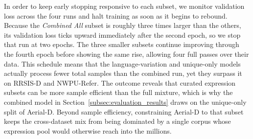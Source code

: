 In order to keep early stopping responsive to each subset, we monitor validation loss across the four runs and halt training as soon as it begins to rebound. Because the \emph{Combined All} subset is roughly three times larger than the others, its validation loss ticks upward immediately after the second epoch, so we stop that run at two epochs. The three smaller subsets continue improving through the fourth epoch before showing the same rise, allowing four full passes over their data. This schedule means that the language-variation and unique-only models actually process fewer total samples than the combined run, yet they surpass it on RRSIS-D and NWPU-Refer. The outcome reveals that curated expression subsets can be more sample efficient than the full mixture, which is why the combined model in Section~\ref{subsec:evaluation_results} draws on the unique-only split of Aerial-D. Beyond sample efficiency, constraining Aerial-D to that subset keeps the cross-dataset mix from being dominated by a single corpus whose expression pool would otherwise reach into the millions.

\begin{table}[t]
\centering
\caption{Expression Enhancement Ablation Across Four Datasets}
\label{tab:ablation_expression_types}
\end{table}

